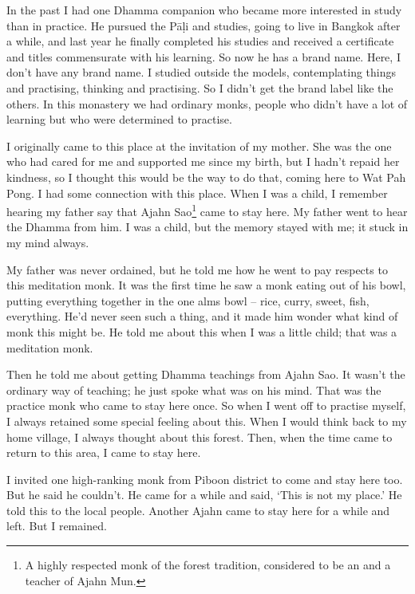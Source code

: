 In the past I had one Dhamma companion who became more interested in study than in practice. He pursued the P\=a\d{l}i and  studies, going to live in Bangkok after a while, and last year he finally completed his studies and received a certificate and titles commensurate with his learning. So now he has a brand name. Here, I don't have any brand name. I studied outside the models, contemplating things and practising, thinking and practising. So I didn't get the brand label like the others. In this monastery we had ordinary monks, people who didn't have a lot of learning but who were determined to practise.

I originally came to this place at the invitation of my mother. She was the one who had cared for me and supported me since my birth, but I hadn't repaid her kindness, so I thought this would be the way to do that, coming here to Wat Pah Pong. I had some connection with this place. When I was a child, I remember hearing my father say that Ajahn Sao\footnote{A highly respected monk of the forest tradition, considered to be an  and a teacher of Ajahn Mun.} came to stay here. My father went to hear the Dhamma from him. I was a child, but the memory stayed with me; it stuck in my mind always.

My father was never ordained, but he told me how he went to pay respects to this meditation monk. It was the first time he saw a monk eating out of his bowl, putting everything together in the one alms bowl -- rice, curry, sweet, fish, everything. He'd never seen such a thing, and it made him wonder what kind of monk this might be. He told me about this when I was a little child; that was a meditation monk.

Then he told me about getting Dhamma teachings from Ajahn Sao. It wasn't the ordinary way of teaching; he just spoke what was on his mind. That was the practice monk who came to stay here once. So when I went off to practise myself, I always retained some special feeling about this. When I would think back to my home village, I always thought about this forest. Then, when the time came to return to this area, I came to stay here.

I invited one high-ranking monk from Piboon district to come and stay here too. But he said he couldn't. He came for a while and said, `This is not my place.' He told this to the local people. Another Ajahn came to stay here for a while and left. But I remained.

